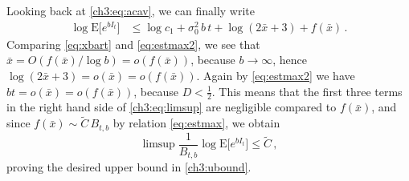 \documentclass[a4paper,reqno,11pt]{amsart}
\numberwithin{equation}{section}
\renewcommand{\tilde}{\widetilde}          %
\newcommand{\PEfont}{\mathrm}
\newcommand{\E}{\ensuremath{\PEfont E}}
\begin{document}
Looking back at \eqref{ch3:eq:acav}, we can finally write
\begin{equation}\label{ch3:eq:limsup}
\begin{split}
 \log \E \big[ e^{bI_t} \big]
 &\leq \log c_1 +  \sigma_0^2\, b\,t + \log (2\bar x + 3) + f(\bar x) \,.
\end{split}
\end{equation}
Comparing \eqref{eq:xbart} and \eqref{eq:estmax2}, we see that
$\bar x = O (f(\bar x) / \log b) = o(f(\bar x))$, because $b \to \infty$,
hence $\log (2\bar x + 3) = o(\bar x) = o(f(\bar x))$.
Again by \eqref{eq:estmax2}
we have $bt = o(\bar x) = o(f(\bar x))$, because $D <\frac{1}{2}$.
This means that the first three terms in the right hand side of \eqref{ch3:eq:limsup}
are negligible compared to $f(\bar x)$, and since $f(\bar x) \sim \tilde C \, B_{t,b}$ by
relation \eqref{eq:estmax}, we obtain
\[
 \limsup \frac{1}{B_{t,b}}
 \log\E\big[e^{bI_t}\big]\leq \tilde C \,,
\]
proving the desired upper bound in \eqref{ch3:ubound}.
\end{document}

